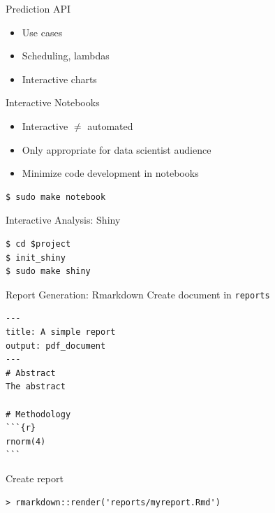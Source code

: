 \documentclass{beamer}
\begin{document}
\begin{frame}{Prediction API}

\begin{itemize}
\item Use cases
\item Scheduling, lambdas
\item Interactive charts
\end{itemize}
\end{frame}



\begin{frame}[fragile]{Interactive Notebooks}

\begin{itemize}
\item Interactive $\neq$ automated
\item Only appropriate for data scientist audience
\item Minimize code development in notebooks
\end{itemize}

\begin{lstlisting}
$ sudo make notebook
\end{lstlisting}
\end{frame}


\begin{frame}[fragile]{Interactive Analysis: Shiny}
\begin{lstlisting}
$ cd $project
$ init_shiny
$ sudo make shiny
\end{lstlisting}
\end{frame}


\begin{frame}[fragile]{Report Generation: Rmarkdown}
Create document in \lstinline|reports|
\begin{lstlisting}
---
title: A simple report
output: pdf_document
---
# Abstract
The abstract

# Methodology
```{r}
rnorm(4)
```
\end{lstlisting}

Create report
\begin{lstlisting}
> rmarkdown::render('reports/myreport.Rmd')
\end{lstlisting}
\end{frame}
\end{document}
